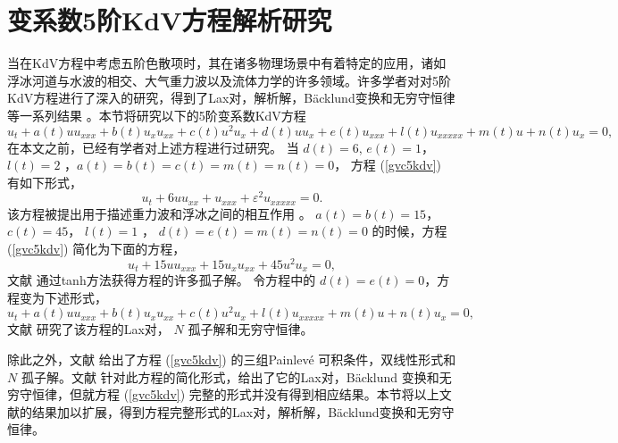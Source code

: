 ﻿\chapter{变系数5阶KdV方程解析研究}
当在KdV方程中考虑五阶色散项时，其在诸多物理场景中有着特定的应用，诸如浮冰河道与水波的相交、大气重力波以及流体力学的许多领域。许多学者对对5阶KdV方程进行了深入的研究，得到了Lax对，解析解，B\"{a}cklund变换和无穷守恒律等一系列结果 。本节将研究以下的5阶变系数KdV方程
\begin{equation}
u_t +a(t)u u_{xxx} + b(t)u_x u_{xx}+c(t) u^2 u_x +d(t) u u_x +e(t)u_{xxx} +l(t)u_{xxxxx} +m(t) u +
n(t) u_x=0 \label{gvc5kdv},
\end{equation}
在本文之前，已经有学者对上述方程进行过研究。
当 $d(t) = 6$, $e(t) = 1$， $l(t) = 2$ ，$a(t) = b(t) =
c(t) = m(t) = n(t) = 0$， 方程 (\ref{gvc5kdv}) 有如下形式，
\begin{equation}
u_t + 6uu_{xx} + u_{xxx} + \varepsilon^2 u_{xxxxx} = 0.\label{equ0}
\end{equation}
该方程被提出用于描述重力波和浮冰之间的相互作用 。
 $a(t) = b(t) = 15$， $c(t) = 45$， $l(t) = 1$ ， $d(t) =
e(t) = m(t) = n(t) = 0$ 的时候，方程(\ref{gvc5kdv})  简化为下面的方程，
\begin{equation}
u_t+ 15 u u_{xxx} + 15u_x u_{xx} + 45 u^2 u_x=0,\label{equ1}
\end{equation}
文献 \cite{5kdv-3,5kdv-4} 通过tanh方法获得方程的许多孤子解。
令方程中的 $d(t) = e(t)=0 $，方程变为下述形式，
\begin{equation}
u_t +a(t)u u_{xxx} + b(t)u_x u_{xx}+c(t) u^2 u_x  +l(t)u_{xxxxx} +m(t) u +
n(t) u_x=0 \label{equ3},
\end{equation}
文献 \cite{5kdv-5,5kdv-6} 研究了该方程的Lax对， $N$ 孤子解和无穷守恒律。

除此之外，文献 \cite{5kdv-9} 给出了方程 (\ref{gvc5kdv}) 的三组Painlev\'{e}
可积条件，双线性形式和 $N$ 孤子解。文献 \cite{5kdv-7,5kdv-8}针对此方程的简化形式，给出了它的Lax对，B\"{a}cklund 变换和无穷守恒律，但就方程 (\ref{gvc5kdv}) 完整的形式并没有得到相应结果。本节将以上文献的结果加以扩展，得到方程完整形式的Lax对，解析解，B\"{a}cklund变换和无穷守恒律。


